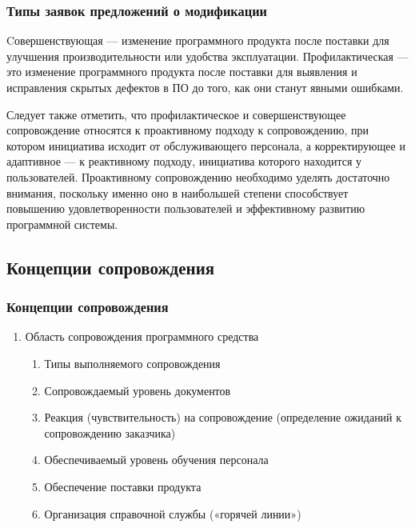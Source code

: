\documentclass{../industrial-development}
\begin{document}
\begin{frame} \frametitle{Типы заявок предложений о модификации}
	\begin{itemize}
		\alert{Cовершенствующая} --- изменение программного продукта после поставки для улучшения производительности или удобства эксплуатации.\newline
		\alert{Профилактическая} ---  это изменение программного продукта после поставки для выявления и исправления скрытых дефектов в ПО до того, как они станут явными ошибками. 
	\end{itemize}
\end{frame}

\lecturenotes
Следует также отметить, что профилактическое и совершенствующее сопровождение относятся к проактивному подходу к сопровождению, при котором инициатива исходит от обслуживающего персонала, а корректирующее и адаптивное — к реактивному подходу, инициатива которого находится у пользователей. 
Проактивному сопровождению необходимо уделять достаточно внимания, поскольку именно оно в наибольшей степени способствует повышению удовлетворенности пользователей и эффективному развитию программной системы. 

\subsection{Концепции сопровождения}
\begin{frame} \frametitle{Концепции сопровождения}
	\begin{enumerate}
	\item Область сопровождения программного средства
		\begin{enumerate} 
		\item Типы выполняемого сопровождения
		\item Сопровождаемый уровень документов
		\item Реакция (чувствительность) на сопровождение (определение ожиданий к сопровождению заказчика)
		\item Обеспечиваемый уровень обучения персонала 
		\item Обеспечение поставки продукта
		\item Организация справочной службы («горячей линии») 
		\end{enumerate}
	\end{enumerate}
\end{frame}
\end{document}

